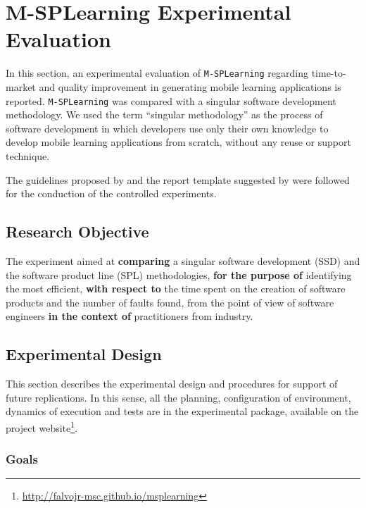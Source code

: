 \section{M-SPLear\allowbreak ning Experimental Evaluation}\label{section3}

In this section, an experimental evaluation of \texttt{M-SPLear\allowbreak ning} regarding time-to-market and quality improvement in generating mobile learning applications is reported. \texttt{M-SPLear\allowbreak ning} was compared with a singular software development methodology. We used the term ``singular methodology'' as the process of software development in which developers use only their own knowledge to develop mobile learning applications from scratch, without any reuse or support technique.  

The guidelines proposed by \cite{wohlin12} and the report template suggested by \cite{jedlitschka07} were followed for the conduction of the controlled experiments.

\subsection{Research Objective}\label{sub:objective}

The experiment aimed at \textbf{comparing} a singular software development (SSD) and the software product line (SPL) methodologies, \textbf{for the purpose of} identifying the most efficient, \textbf{with respect to} the time spent on the creation of software products and the number of faults found, from the point of view of software engineers \textbf{in the context of} practitioners from industry.

\subsection{Experimental Design}\label{sub:design}


This section describes the experimental design and procedures for support of future replications. In this sense, all the planning, configuration of environment, dynamics of execution and tests are in the experimental package, available on the project website\footnote{\url{http://falvojr-msc.github.io/msplearning}}.

\subsubsection*{Goals}

